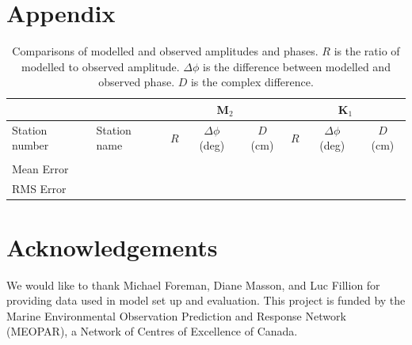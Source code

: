 \documentclass[pdftex,10pt]{article}
\begin{document}
\section{Appendix}
\begin{table}[h]
\centering 
\begin{tabular}{l l c c c c c c} 
\hline 
& & \multicolumn{3}{c}{M$_2$} & \multicolumn{3}{c}{K$_1$} \\ 
\hline 
Station number & Station name & $R$ & $ \Delta \phi$ (deg) & $D$ (cm) & $R$ & $ \Delta \phi$ (deg) & $D$ (cm) \\
\hline 
               &              &     &                      &          &     &                      &          \\
\hline   
Mean Error     &              &     &                      &          &     &                      &          \\
RMS Error      &              &     &                      &          &     &                      &          \\
\hline  
\end{tabular}
\caption{Comparisons of modelled and observed amplitudes and phases. $R$ is the ratio of modelled to observed amplitude. $\Delta \phi$ is the difference between modelled and observed phase. $D$ is the complex difference. }
\label{tab:comparison} 
\end{table}

\section{Acknowledgements}\label{sec:ack}
We would like to thank Michael Foreman, Diane Masson, and Luc Fillion for providing data used in model set up and evaluation. This project is funded by the Marine Environmental Observation Prediction and Response Network (MEOPAR), a Network of Centres of Excellence of Canada.  



\end{document}
